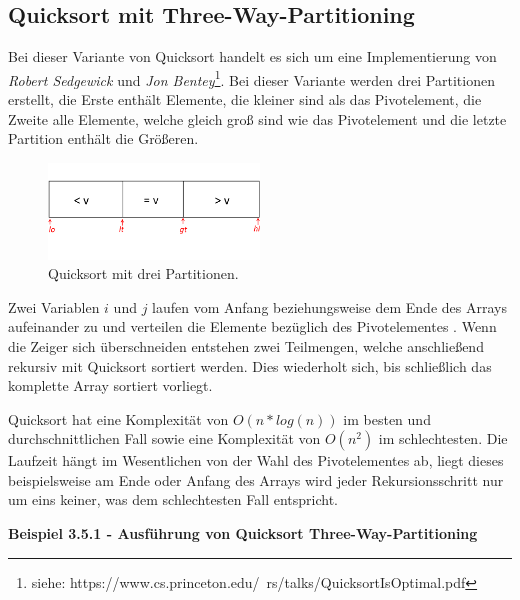 \subsection{Quicksort mit Three-Way-Partitioning}

Bei dieser Variante von Quicksort handelt es sich um eine Implementierung von \textit{Robert Sedgewick} und \textit{Jon Bentey}\footnote{siehe: https://www.cs.princeton.edu/~rs/talks/QuicksortIsOptimal.pdf}. Bei dieser Variante werden drei Partitionen erstellt, die Erste enthält Elemente, die kleiner sind als das Pivotelement, die Zweite alle Elemente, welche gleich groß sind wie das Pivotelement und die letzte Partition enthält die  Größeren.

\begin{figure}[htbp] 
	\centering
	\includegraphics[width=0.5\textwidth]{./img/quicksort-threeway}
	\caption{Quicksort mit drei Partitionen.}
\end{figure}

\noindent
Zwei Variablen $i$ und $j$ laufen vom Anfang beziehungsweise dem Ende des Arrays aufeinander zu und verteilen die Elemente bezüglich des Pivotelementes . Wenn die Zeiger sich überschneiden entstehen zwei Teilmengen, welche anschließend rekursiv mit Quicksort sortiert werden. Dies wiederholt sich, bis schließlich das komplette Array sortiert vorliegt.

Quicksort hat eine Komplexität von $O(n*log(n))$ im besten und durchschnittlichen Fall sowie eine Komplexität von $O(n^2)$ im schlechtesten. Die Laufzeit hängt im Wesentlichen von der Wahl des Pivotelementes  ab, liegt dieses beispielsweise am Ende oder Anfang des Arrays wird jeder Rekursionsschritt nur um eins keiner, was dem schlechtesten Fall entspricht.\\

\newpage

\noindent
\textbf{Beispiel 3.5.1 - Ausführung von Quicksort Three-Way-Partitioning}

